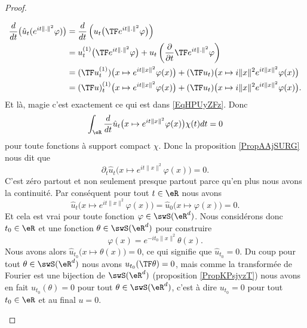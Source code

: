 \begin{proof}
\begin{subproof}
        \begin{subequations}    \label{EqCRGfbLU}
            \begin{align}
            \frac{ d }{ dt }\big( \hat u_t( e^{it\| . \|^2}\varphi) \big)&=\frac{ d }{ dt }\left( u_t\big( \TF e^{it\| . \|^2}\varphi \big) \right)\\
            &=u_t^{(1)}\big( \TF  e^{it\| . \|^2}\varphi \big)+u_t\left( \frac{ \partial  }{ \partial t }\TF e^{it\| . \|^2}\varphi \right)\\
            &=(\TF u_t^{(1)})\big( x\mapsto  e^{it\| x \|^2}\varphi(x) \big)+(\TF u_t)\big( x\mapsto i\| x \|^2 e^{it\| x \|^2}\varphi(x) \big)\\
            &=(\TF u)_t^{(1)}\big( x\mapsto  e^{it\| x \|^2}\varphi(x) \big)+(\TF u_t)\big( x\mapsto i\| x \|^2 e^{it\| x \|^2}\varphi(x) \big).
            \end{align}
        \end{subequations}
        Et là, magie c'est exactement ce qui est dans \eqref{EqHPUyZFz}. Donc
        \begin{equation}
            \int_{\eR}\frac{ d }{ dt }\hat u_t\big( x\mapsto  e^{it\| x \|^2}\varphi(x) \big)\chi(t)dt=0
        \end{equation}
        pour toute fonctions à support compact \( \chi\). Donc la proposition \ref{PropAAjSURG} nous dit que
        \begin{equation}
            \partial_t\hat u_t\big( x\mapsto e^{it\| x \|^2}\varphi(x) \big)=0.
        \end{equation}
        C'est zéro partout et non seulement presque partout parce qu'en plus nous avons la continuité. Par conséquent pour tout \( t\in \eR\) nous avons
        \begin{equation}
            \hat u_t\big( x\mapsto e^{it\| x \|^2}\varphi(x) \big)=\hat u_0\big( x\mapsto \varphi(x)\big)=0.
        \end{equation}
        Et cela est vrai pour toute fonction \( \varphi\in\swS(\eR^d)\). Nous considérons donc \( t_0\in \eR\) et une fonction \( \theta\in\swS(\eR^d)\) pour construire
        \begin{equation}
            \varphi(x)= e^{-it_0\| x \|^2}\theta(x).
        \end{equation}
        Nous avons alors \( \hat u_{t_0}\big( x\mapsto\theta(x) \big)=0\), ce qui signifie que \( \hat u_{t_0}=0\). Du coup pour tout \( \theta\in\swS(\eR^d)\) nous avons \( u_{t_0}(\TF\theta)=0\), mais comme la transformée de Fourier est une bijection de \( \swS(\eR^d)\) (proposition \ref{PropKPsjyzT}) nous avons en fait \( u_{t_0}(\theta)=0\) pour tout \( \theta\in\swS(\eR^d)\), c'est à dire \( u_{t_0}=0\) pour tout \( t_0\in \eR\) et au final \( u=0\).
    \end{subproof}
\end{proof}


